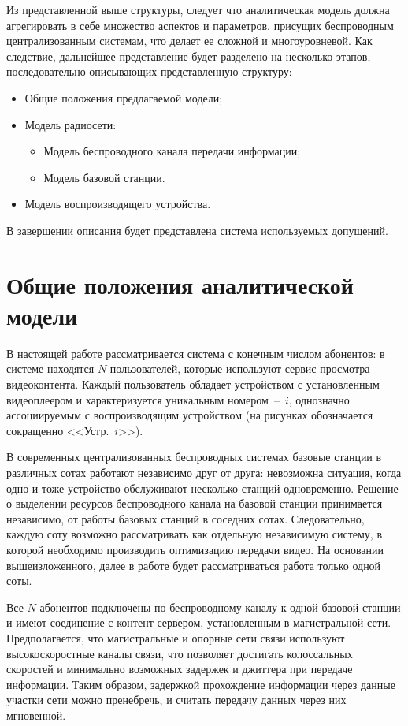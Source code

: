Из представленной выше структуры, следует что аналитическая модель должна агрегировать в себе множество аспектов и параметров, присущих беспроводным централизованным системам, что делает ее сложной и многоуровневой. Как следствие, дальнейшее представление будет разделено на несколько этапов, последовательно описывающих представленную структуру:
\begin{itemize}
  \item Общие положения предлагаемой модели;
  \item Модель радиосети:
  \begin{itemize}
  	\item Модель беспроводного канала передачи информации;
  	\item Модель базовой станции.
  \end{itemize}
  \item Модель воспроизводящего устройства.
\end{itemize}
В завершении описания будет представлена система используемых допущений.

\section{Общие положения аналитической модели}
\label{chap2:GeneralOverview}

В настоящей работе рассматривается система с конечным числом абонентов: в системе находятся $N$ пользователей, которые используют сервис просмотра видеоконтента. Каждый пользователь обладает устройством с установленным видеоплеером и характеризуется уникальным номером~--~$i$, однозначно ассоциируемым с воспроизводящим устройством (на рисунках обозначается сокращенно <<Устр.~$i$>>).

В современных централизованных беспроводных системах базовые станции в различных сотах работают независимо друг от друга: невозможна ситуация, когда одно и тоже устройство обслуживают несколько станций одновременно. Решение о выделении ресурсов беспроводного канала на базовой станции принимается независимо, от работы базовых станций в соседних сотах. Следовательно, каждую соту возможно рассматривать как отдельную независимую систему, в которой необходимо производить оптимизацию передачи видео. На основании вышеизложенного, далее в работе будет рассматриваться работа только одной соты.

Все $N$ абонентов подключены по беспроводному каналу к одной базовой станции и имеют соединение с контент сервером, установленным в магистральной сети. Предполагается, что магистральные и опорные сети связи используют высокоскоростные каналы связи, что позволяет достигать колоссальных скоростей и минимально возможных задержек и джиттера при передаче информации. Таким образом, задержкой прохождение информации через данные участки сети можно пренебречь, и считать передачу данных через них мгновенной.

